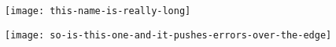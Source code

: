 \documentclass{article}
\begin{document}
\texttt{[image: this-name-is-really-long]}

\texttt{[image: so-is-this-one-and-it-pushes-errors-over-the-edge]}
\end{document}
